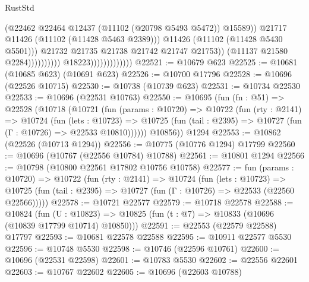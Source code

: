 \begin{lexlean}{RustStd}
\begin{coremodule}
                                                          (@22462
                                                            @22464
                                                            @12437
                                                            (@11102 (@20798 @5493 @5472))
                                                            @15589))
                                                        @21717
                                                        @11426
                                                        (@11102 (@11428 @5463 @2389)))
                                                      @11426
                                                      (@11102 (@11428 @5430 @5501)))
                                                    @21732
                                                    @21735
                                                    @21738
                                                    @21742
                                                    @21747
                                                    @21753))
                                                (@11137 @21580 @2284))))))))))
                              @18223)))))))))))))
@22521 := @10679 @623
@22525 := @10681 (@10685 @623) (@10691 @623)
@22526 := @10700 @17796
@22528 := @10696 (@22526 @10715)
@22530 := @10738 (@10739 @623)
@22531 := @10734 @22530
@22533 := @10696 (@22531 @10763)
@22550 := @10695
    (fun (fn : @51) =>
    @22528
      (@10718
        (@10721
          (fun (params : @10720) =>
          @10722
            (fun (rty : @2141) =>
            @10724
              (fun (lets : @10723) =>
              @10725 (fun (tail : @2395) => @10727 (fun (Γ : @10726) => @22533 @10810))))))
        @10856))
    @1294
@22553 := @10862 (@22526 (@10713 @1294))
@22556 := @10775 (@10776 @1294) @17799
@22560 := @10696 (@10767 (@22556 @10784) @10788)
@22561 := @10801 @1294
@22566 := @10798 (@10800 @22561 @17802 @10756 @10758)
@22577 := fun (params : @10720) =>
  @10722
    (fun (rty : @2141) =>
    @10724
      (fun (lets : @10723) =>
      @10725 (fun (tail : @2395) => @10727 (fun (Γ : @10726) => @22533 (@22560 @22566)))))
@22578 := @10721 @22577
@22579 := @10718 @22578
@22588 := @10824
    (fun (U : @10823) => @10825 (fun (t : @7) => @10833 (@10696 (@10839 @17799 @10714) @10850)))
@22591 := @22553 (@22579 @22588) @17797
@22593 := @10681 @22578 @22588
@22595 := @10911 @22577 @5530
@22596 := @10748 @5530
@22598 := @10746 (@22596 @10761)
@22600 := @10696 (@22531 @22598)
@22601 := @10783 @5530
@22602 := @22556 @22601
@22603 := @10767 @22602
@22605 := @10696 (@22603 @10788)

\end{coremodule}
\end{lexlean}
